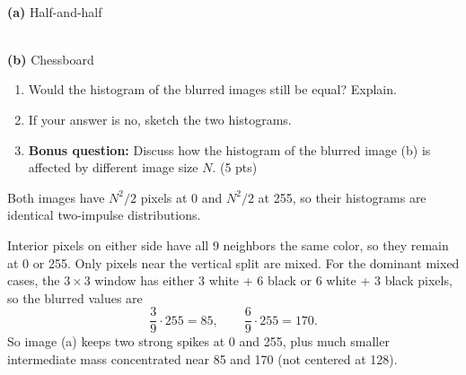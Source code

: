 \documentclass[12pt]{article}
\begin{document}
\vspace{0.3cm}

\begin{center}
\begin{minipage}{0.35\textwidth}\centering
{}\\[0.2cm]
\textbf{(a)} Half-and-half
\end{minipage}
\hfill
\begin{minipage}{0.35\textwidth}\centering
{}\\[0.2cm]
\textbf{(b)} Chessboard
\end{minipage}
\end{center}

\vspace{-0.1cm}

\begin{enumerate}[label=(\alph*)]
\item Would the histogram of the blurred images still be equal? Explain.
\item If your answer is no, sketch the two histograms.
\item \textbf{Bonus question:} Discuss how the histogram of the blurred image (b) is affected by different image size $N$. (5 pts)
\end{enumerate}

\vspace{0.5cm}

\begin{stepbox}
Both images have $N^2/2$ pixels at 0 and $N^2/2$ at 255, so their histograms are identical two-impulse distributions.
\end{stepbox}

\begin{stepbox}
Interior pixels on either side have all 9 neighbors the same color, so they remain at 0 or 255. Only pixels near the vertical split are mixed. For the dominant mixed cases, the $3\times 3$ window has either 3 white + 6 black or 6 white + 3 black pixels, so the blurred values are
\[
\frac{3}{9}\cdot 255 = 85,\qquad \frac{6}{9}\cdot 255 = 170.
\]
So image (a) keeps two strong spikes at 0 and 255, plus much smaller intermediate mass concentrated near 85 and 170 (not centered at 128).
\end{stepbox}
\end{document}
